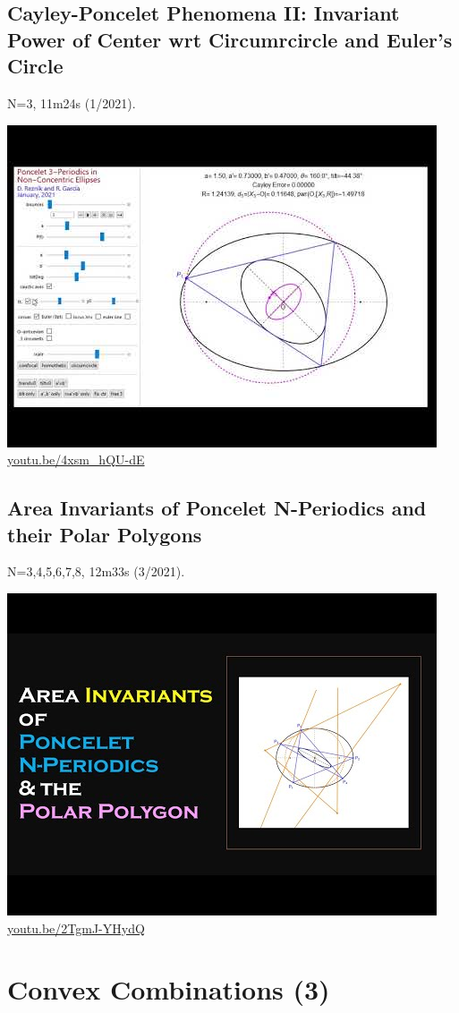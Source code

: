\documentclass[12pt]{amsart}
\begin{document}
\subsection{Cayley-Poncelet Phenomena II: Invariant Power of Center wrt Circumrcircle and Euler's Circle}
\label{vid:4xsm_hQU-dE}
\noindent N=3, 11m24s (1/2021). 
\begin{center}\includegraphics[width=.5\textwidth]{pics/4xsm_hQU-dE.jpg} \\ 
\href{https://youtu.be/4xsm_hQU-dE}{\url{youtu.be/4xsm\_hQU-dE}}\end{center}
% 

\subsection{Area Invariants of Poncelet N-Periodics and their Polar Polygons}
\label{vid:2TgmJ-YHydQ}
\noindent N=3,4,5,6,7,8, 12m33s (3/2021). 
\begin{center}\includegraphics[width=.5\textwidth]{pics/2TgmJ-YHydQ.jpg} \\ 
\href{https://youtu.be/2TgmJ-YHydQ}{\url{youtu.be/2TgmJ-YHydQ}}\end{center}
% 


\section{Convex Combinations (3)}
\end{document}
